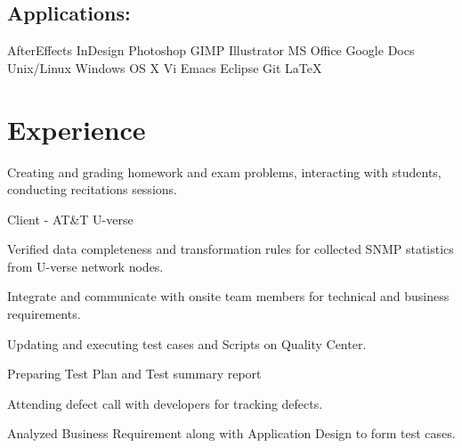 \documentclass[]{deedy-resume-openfont}
\begin{document}
\begin{minipage}[t]{0.33\textwidth}
\subsection{Applications:}
AfterEffects \textbullet{} InDesign \textbullet{} Photoshop \textbullet{} GIMP \textbullet{} Illustrator \textbullet{} MS Office \textbullet{} Google Docs \textbullet{} Unix/Linux \textbullet{} Windows \textbullet{} OS X \textbullet{} Vi \textbullet{} Emacs \textbullet{} Eclipse \textbullet{} Git \textbullet{} \LaTeX \\


%
%

\end{minipage} 
\hfill
\begin{minipage}[t]{0.66\textwidth} 


\section{Experience}

\vspace{\topsep} %
\begin{tightemize}
\item Creating and grading homework and exam problems, interacting with students,
conducting recitations sessions.
\end{tightemize}
\sectionsep

\begin{tightemize}
\item Client - AT\&T U-verse
\begin{tightemize}
\item Verified data completeness and transformation rules for collected SNMP statistics from U-verse network nodes.
\item Integrate and communicate with onsite team members for technical and business requirements.
\item Updating and executing test cases and Scripts on Quality Center.
\item Preparing Test Plan and Test summary report
\item Attending defect call with developers for tracking defects.
\item Analyzed Business Requirement along with Application Design to form test cases.
\end{tightemize}
\end{tightemize}
\sectionsep
\sectionsep


\end{minipage}
\end{document}
